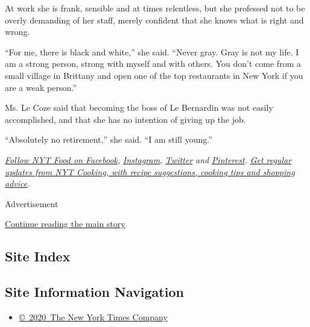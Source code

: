 At work she is frank, sensible and at times relentless, but she
professed not to be overly demanding of her staff, merely confident that
she knows what is right and wrong.

``For me, there is black and white,'' she said. ``Never gray. Gray is
not my life. I am a strong person, strong with myself and with others.
You don't come from a small village in Brittany and open one of the top
restaurants in New York if you are a weak person.''

Ms. Le Coze said that becoming the boss of Le Bernardin was not easily
accomplished, and that she has no intention of giving up the job.

``Absolutely no retirement,'' she said. ``I am still young.''

\href{https://www.facebookcorewwwi.onion/nytfood/}{\emph{Follow NYT Food
on Facebook}}\emph{,}
\href{https://instagram.com/nytfood}{\emph{Instagram}}\emph{,}
\href{https://twitter.com/nytfood}{\emph{Twitter}} \emph{and}
\href{https://www.pinterest.com/nytfood/}{\emph{Pinterest}}\emph{.}
\href{https://www.nytimes3xbfgragh.onion/newsletters/cooking}{\emph{Get
regular updates from NYT Cooking, with recipe suggestions, cooking tips
and shopping advice}}\emph{.}

Advertisement

\protect\hyperlink{after-bottom}{Continue reading the main story}

\hypertarget{site-index}{%
\subsection{Site Index}\label{site-index}}

\hypertarget{site-information-navigation}{%
\subsection{Site Information
Navigation}\label{site-information-navigation}}

\begin{itemize}
\tightlist
\item
  \href{https://help.nytimes3xbfgragh.onion/hc/en-us/articles/115014792127-Copyright-notice}{©~2020~The
  New York Times Company}
\end{itemize}

